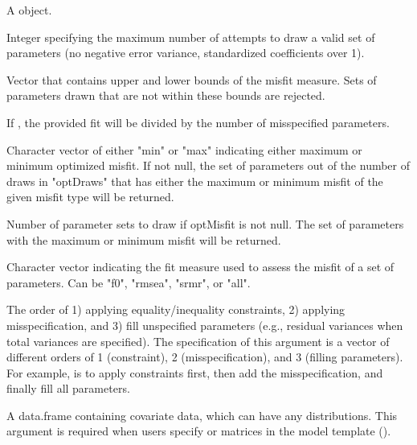 \documentclass[a4paper]{book}
\begin{document}
\begin{Arguments}
\begin{ldescription}
\item[\code{model}] 
A  object. 

\item[\code{maxDraw}] 
Integer specifying the maximum number of attempts to draw a valid set of parameters (no negative error variance, standardized coefficients over 1).

\item[\code{misfitBounds}] 
Vector that contains upper and lower bounds of the misfit measure. Sets of parameters drawn that are not within these bounds are rejected.

\item[\code{averageNumMisspec}] 
If , the provided fit will be divided by the number of misspecified parameters. 

\item[\code{optMisfit}] 
Character vector of either "min" or "max" indicating either maximum or minimum optimized misfit. If not null, the set of parameters out of the number of draws in "optDraws" that has either the maximum or minimum misfit of the given misfit type will be returned.

\item[\code{optDraws}] 
Number of parameter sets to draw if optMisfit is not null. The set of parameters with the maximum or minimum misfit will be returned.

\item[\code{misfitType}] 
Character vector indicating the fit measure used to assess the misfit of a set of parameters. Can be "f0", "rmsea", "srmr", or "all". 

\item[\code{createOrder}] 
The order of 1) applying equality/inequality constraints, 2) applying misspecification, and 3) fill unspecified parameters (e.g., residual variances when total variances are specified). The specification of this argument is a vector of different orders of 1 (constraint), 2 (misspecification), and 3 (filling parameters). For example,  is to apply constraints first, then add the misspecification, and finally fill all parameters. 

\item[\code{covData}]  
A data.frame containing covariate data, which can have any distributions. This argument is required when users specify  or  matrices in the model template ().

\end{ldescription}
\end{Arguments}
\end{document}

